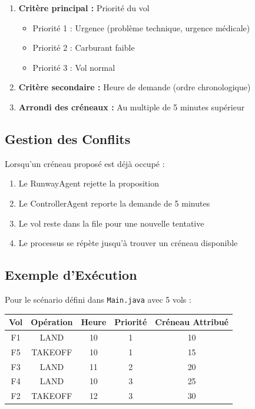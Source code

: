 \documentclass[12pt,a4paper]{article}
\begin{document}
\begin{enumerate}[leftmargin=*, label=\textcolor{primaryblue}{\textbf{\arabic*.}}]
    \item \textbf{Critère principal :} Priorité du vol
    \begin{itemize}
        \item Priorité 1 : Urgence (problème technique, urgence médicale)
        \item Priorité 2 : Carburant faible
        \item Priorité 3 : Vol normal
    \end{itemize}

    \item \textbf{Critère secondaire :} Heure de demande (ordre chronologique)

    \item \textbf{Arrondi des créneaux :} Au multiple de 5 minutes supérieur
\end{enumerate}

\subsection{Gestion des Conflits}

\begin{tcolorbox}[colback=lightblue!15, colframe=primaryblue, title=\textbf{Processus de Résolution}]
Lorsqu'un créneau proposé est déjà occupé :
\begin{enumerate}[leftmargin=*]
    \item Le RunwayAgent rejette la proposition
    \item Le ControllerAgent reporte la demande de 5 minutes
    \item Le vol reste dans la file pour une nouvelle tentative
    \item Le processus se répète jusqu'à trouver un créneau disponible
\end{enumerate}
\end{tcolorbox}

\subsection{Exemple d'Exécution}

Pour le scénario défini dans \texttt{Main.java} avec 5 vols :

\begin{center}
\begin{tabular}{|c|c|c|c|c|}
\hline
\rowcolor{lightblue!30}
\textbf{Vol} & \textbf{Opération} & \textbf{Heure} & \textbf{Priorité} & \textbf{Créneau Attribué} \\
\hline
F1 & LAND & 10 & 1 & 10 \\
\hline
F5 & TAKEOFF & 10 & 1 & 15 \\
\hline
F3 & LAND & 11 & 2 & 20 \\
\hline
F4 & LAND & 10 & 3 & 25 \\
\hline
F2 & TAKEOFF & 12 & 3 & 30 \\
\hline
\end{tabular}
\end{center}
\end{document}
